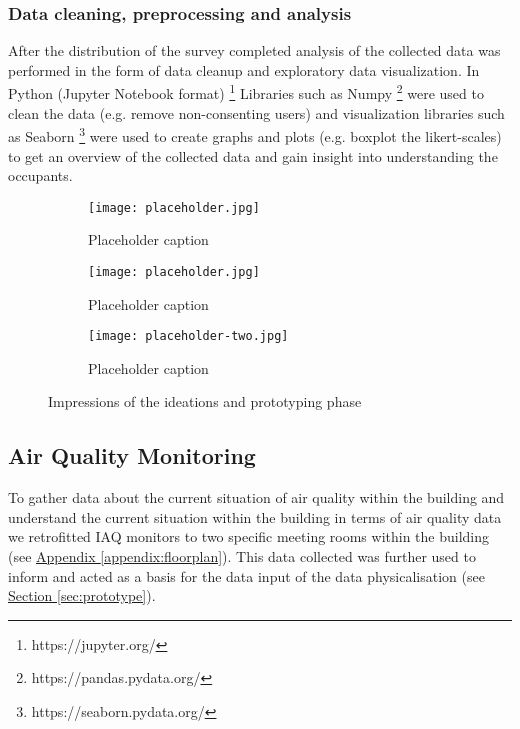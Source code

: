 \subsubsection{Data cleaning, preprocessing and analysis}
\label{sec:analysis}
After the distribution of the survey completed analysis of the collected data was performed in the form of data cleanup and exploratory data visualization. In Python (Jupyter Notebook format) \footnote{https://jupyter.org/} Libraries such as Numpy \footnote{https://pandas.pydata.org/} were used to clean the data (e.g. remove non-consenting users) and visualization libraries such as Seaborn \footnote{https://seaborn.pydata.org/} were used to create graphs and plots (e.g. boxplot the likert-scales) to get an overview of the collected data and gain insight into understanding the occupants.

\begin{figure*}[!t]
    \centering
    \begin{subfigure}[b]{0.23\textwidth}
        \texttt{[image: placeholder.jpg]}
        \caption{Placeholder caption}
        \label{fig:1}
    \end{subfigure}
    \hfill
    \begin{subfigure}[b]{0.23\textwidth}
        \texttt{[image: placeholder.jpg]}
        \caption{Placeholder caption}
        \label{fig:2}
    \end{subfigure}
    \hfill
    \begin{subfigure}[b]{0.5\textwidth}
        \texttt{[image: placeholder-two.jpg]}
        \caption{Placeholder caption}
        \label{fig:3_4_combined}
    \end{subfigure}
    \caption{Impressions of the ideations and prototyping phase}
    \label{fig:full_width}
\end{figure*}

\subsection{Air Quality Monitoring}
\label{sec:monitoring}

To gather data about the current situation of air quality within the building and understand the current situation within the building in terms of air quality data we retrofitted IAQ monitors to two specific meeting rooms within the building (see \hyperref[appendix:floorplan]{Appendix \ref*{appendix:floorplan}}). This data collected was further used to inform and acted as a basis for the data input of the data physicalisation (see \hyperref[sec:prototype]{Section \ref*{sec:prototype}}).

